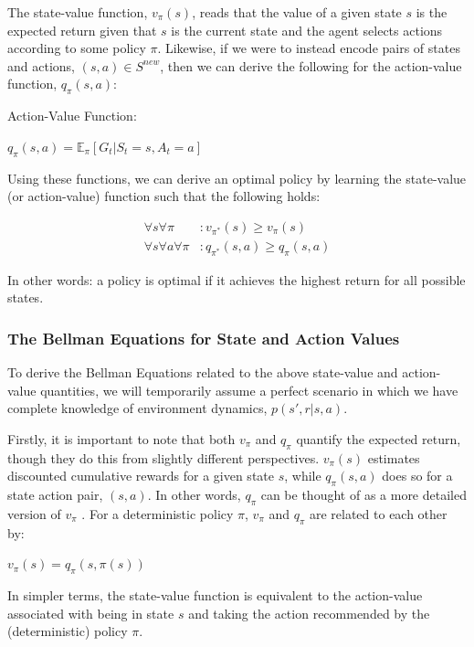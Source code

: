 \documentclass{article}
\begin{document}
The state-value function, $v_{\pi}(s)$, reads that the value of a given state $s$ is the expected return given that $s$ is the current state and the agent selects actions according to some policy $\pi$. Likewise, if we were to instead encode pairs of states and actions, $(s,a)\in S^{new}$, then we can derive the following for the action-value function, $q_{\pi}(s,a)$:

Action-Value Function:
\begin{center}
    $q_{\pi}(s,a)=\mathbb{E}_{\pi}[G_t|S_t=s,A_t=a]$
\end{center}

Using these functions, we can derive an optimal policy by learning the state-value (or action-value) function such that the following holds:
\vspace{-5mm}\begin{center}
    \begin{align*}
        \forall s \forall\pi &: v_{\pi^*}(s) \geq v_{\pi}(s)\\
        \forall s\forall a \forall\pi &: q_{\pi^*}(s,a) \geq q_{\pi}(s,a)
    \end{align*}
\end{center}

In other words: a policy is optimal if it achieves the highest return for all possible states.

\subsubsection{The Bellman Equations for State and Action Values}

To derive the Bellman Equations related to the above state-value and action-value quantities, we will temporarily assume a perfect scenario in which we have complete knowledge of environment dynamics, $p(s',r|s,a)$.

Firstly, it is important to note that both $v_{\pi}$ and $q_{\pi}$ quantify the expected return, though they do this from slightly different perspectives. $v_{\pi}(s)$ estimates discounted cumulative rewards for a given state $s$, while $q_{\pi}(s,a)$ does so for a state action pair, $(s,a)$. In other words, $q_{\pi}$ can be thought of as a more detailed version of $v_{\pi}$ \cite{WangRLBasics}. For a deterministic policy $\pi$, $v_{\pi}$ and $q_{\pi}$ are related to each other by:
\begin{center}
    $v_{\pi}(s) = q_{\pi}(s,\pi(s))$
\end{center}
In simpler terms, the state-value function is equivalent to the action-value associated with being in state $s$ and taking the action recommended by the (deterministic) policy $\pi$.
\end{document}
